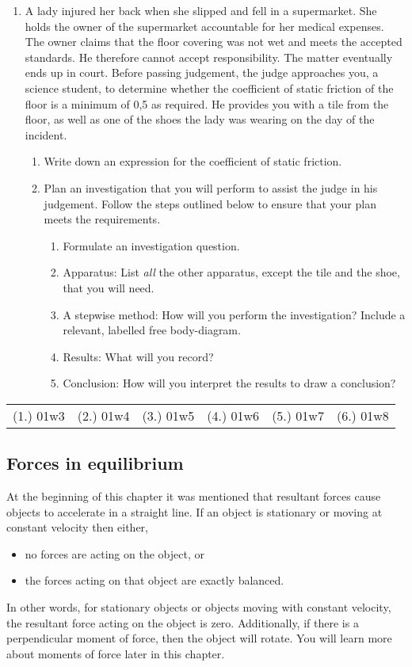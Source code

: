 {\begin{enumerate}
\item {A lady injured her back when she slipped and fell in a supermarket. She holds the owner of the supermarket accountable for her medical expenses. The owner claims that the floor covering was not wet and meets the accepted standards. He therefore cannot accept responsibility. The matter eventually ends up in court. Before passing judgement, the judge approaches you, a science student, to determine whether the coefficient of static friction of the floor is a minimum of 0,5 as required. He provides you with a tile from the floor, as well as one of the shoes the lady was wearing on the day of the incident.
\begin{enumerate}
\item{Write down an expression for the coefficient of static friction.}
\item{Plan an investigation that you will perform to assist the judge in his judgement. Follow the steps outlined below to ensure that your plan meets the requirements.
\begin{enumerate}
\item{Formulate an investigation question.}
\item{Apparatus: List \emph{all} the other apparatus, except the tile and the shoe, that you will need.}
\item{A stepwise method: How will you perform the investigation? Include a relevant, labelled free body-diagram.}
\item{Results: What will you record?}
\item{Conclusion: How will you interpret the results to draw a conclusion?}
\end{enumerate}}
\end{enumerate}
}
\end{enumerate}
\practiceinfo

\begin{tabular}[h]{cccccc}
(1.) 01w3 & (2.) 01w4 & (3.) 01w5 & (4.) 01w6 & (5.) 01w7 & (6.) 01w8 &
 \end{tabular}}

\subsection{Forces in equilibrium}
At the beginning of this chapter it was mentioned that resultant forces cause objects to accelerate in a straight line. If an object is stationary or moving at constant velocity then either,
\begin{itemize}
\item{no forces are acting on the object, or}
\item{the forces acting on that object are exactly balanced.}
\end{itemize}
In other words, for stationary objects or objects moving with constant velocity, the resultant force acting on the object is zero. Additionally, if there is a perpendicular moment of force, then the object will rotate. You will learn more about moments of force later in this chapter.

